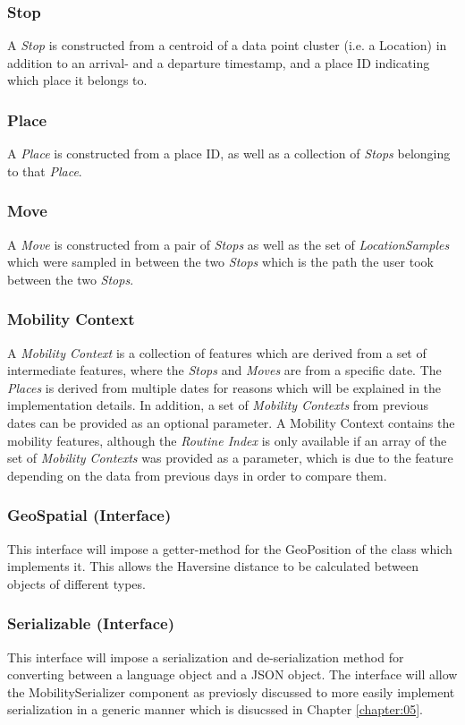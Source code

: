 \subsubsection*{Stop}
A \textit{Stop} is constructed from a centroid of a data point cluster (i.e. a Location) in addition to an arrival- and a departure timestamp, and a place ID indicating which place it belongs to.

\subsubsection*{Place}
A \textit{Place} is constructed from a place ID, as well as a collection of \textit{Stops} belonging to that \textit{Place}. 

\subsubsection*{Move}
A \textit{Move} is constructed from a pair of \textit{Stops} as well as the set of \textit{LocationSamples} which were sampled in between the two \textit{Stops} which is the path the user took between the two \textit{Stops}.

\subsubsection*{Mobility Context}
A \textit{Mobility Context} is a collection of features which are derived from a set of intermediate features, where the \textit{Stops} and \textit{Moves} are from a specific date. The \textit{Places} is derived from multiple dates for reasons which will be explained in the implementation details. In addition, a set of \textit{Mobility Contexts} from previous dates can be provided as an optional parameter. A Mobility Context contains the mobility features, although the \textit{Routine Index} is only available if an array of the set of \textit{Mobility Contexts} was provided as a parameter, which is due to the feature depending on the data from previous days in order to compare them.

\subsubsection*{GeoSpatial (Interface)}
This interface will impose a getter-method for the GeoPosition of the class which implements it. This allows the Haversine distance to be calculated between objects of different types.

\subsubsection*{Serializable (Interface)}
This interface will impose a serialization and de-serialization method for converting between a language object and a JSON object. The interface will allow the MobilitySerializer component as previosly discussed to more easily implement serialization in a generic manner which is disucssed in Chapter \ref{chapter:05}.

